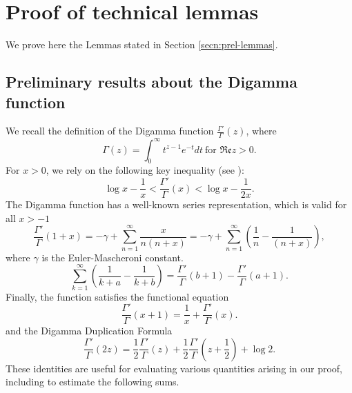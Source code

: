 \documentclass[11pt,letterpaper,oneside,reqno]{amsart}
\renewcommand{\^}[1]{\widehat{#1}}
\renewcommand{\Re}{{\mathfrak{Re}}}
\numberwithin{equation}{section}
\theoremstyle{remark}
\begin{document}
\section{Proof of technical lemmas} \label{secn:proofs-lemmas}
We prove here the Lemmas stated in Section \ref{secn:prel-lemmas}.
%
\subsection{Preliminary results about the Digamma function}\label{sec:digamma}
We recall the definition of the Digamma function $\frac{\Gamma'}{\Gamma}(z)$, where 
\[
\Gamma(z) = \int_0^{\infty} t^{z-1}e^{-t}dt\ \text{for }\Re z>0.
\]
For $x>0$, we rely on the following key inequality (see \cite{abramowitz1965handbook}):
\begin{equation}
    \log x - \frac{1}{x} < \frac{\Gamma'}{\Gamma}(x) < \log x -  \frac{1}{2x}. \label{digamma1}
\end{equation}
%
The Digamma function has a well-known series representation, which is valid for all $x>-1$ 
\begin{equation}
\frac{\Gamma'}{\Gamma}(1+x) = -\gamma + \sum_{n=1}^{\infty} \frac{x}{n(n+x)}
= -\gamma + \sum_{n=1}^{\infty} \left( \frac{1}n  - \frac1{(n+x)} \right) ,\label{digamma2}
\end{equation}
%
where $\gamma$ is the Euler-Mascheroni constant. 
\begin{equation}
\sum_{k=1}^{\infty} \left(\frac{1}{k+a} - \frac{1}{k+b}\right) 
= \frac{\Gamma'}{\Gamma}(b+1) - \frac{\Gamma'}{\Gamma}(a+1).
\label{digamma3}
\end{equation}
%
Finally, the function satisfies the functional equation
\begin{equation}\label{fe-digamma}
\frac{\Gamma'}{\Gamma}(x+1)=\frac1x +\frac{\Gamma'}{\Gamma}(x).
\end{equation}
 and the Digamma Duplication Formula 
 \begin{equation}
    \frac{\Gamma'}{\Gamma}(2z) = \frac{1}{2} \frac{\Gamma'}{\Gamma}(z) + \frac{1}{2} \frac{\Gamma'}{\Gamma}(z + \frac{1}{2}) + \log 2. \label{gauss digamma}
\end{equation} %
These identities are useful for evaluating various quantities arising in our proof, including to estimate the following sums. 
%
\end{document}
